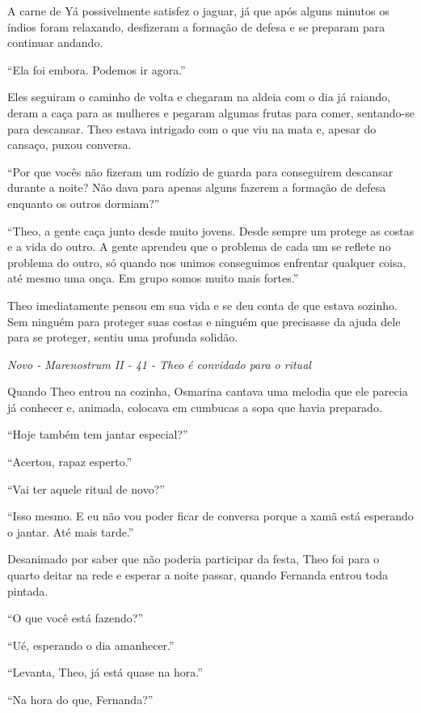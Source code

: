 A carne de Yá possivelmente satisfez o jaguar, já que após alguns
minutos os índios foram relaxando, desfizeram a formação de defesa e se
preparam para continuar andando.

``Ela foi embora. Podemos ir agora.''

Eles seguiram o caminho de volta e chegaram na aldeia com o dia já
raiando, deram a caça para as mulheres e pegaram algumas frutas para
comer, sentando-se para descansar. Theo estava intrigado com o que viu
na mata e, apesar do cansaço, puxou conversa.

``Por que vocês não fizeram um rodízio de guarda para conseguirem
descansar durante a noite? Não dava para apenas alguns fazerem a
formação de defesa enquanto os outros dormiam?''

``Theo, a gente caça junto desde muito jovens. Desde sempre um protege
as costas e a vida do outro. A gente aprendeu que o problema de cada um
se reflete no problema do outro, só quando nos unimos conseguimos
enfrentar qualquer coisa, até mesmo uma onça. Em grupo somos muito mais
fortes.''

Theo imediatamente pensou em sua vida e se deu conta de que estava
sozinho. Sem ninguém para proteger suas costas e ninguém que precisasse
da ajuda dele para se proteger, sentiu uma profunda solidão.

\asterisc

\emph{Novo - Marenostrum II - 41 - Theo é convidado para o ritual}

Quando Theo entrou na cozinha, Osmarina cantava uma melodia que ele
parecia já conhecer e, animada, colocava em cumbucas a sopa que havia
preparado.

``Hoje também tem jantar especial?''

``Acertou, rapaz esperto.''

``Vai ter aquele ritual de novo?''

``Isso mesmo. E eu não vou poder ficar de conversa porque a xamã está
esperando o jantar. Até mais tarde.''

Desanimado por saber que não poderia participar da festa, Theo foi para
o quarto deitar na rede e esperar a noite passar, quando Fernanda entrou
toda pintada.

``O que você está fazendo?''

``Ué, esperando o dia amanhecer.''

``Levanta, Theo, já está quase na hora.''

``Na hora do que, Fernanda?''

